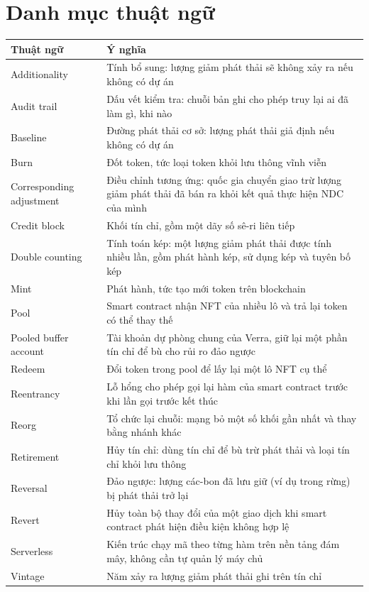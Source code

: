 \documentclass[a4paper,oneside]{report}
\begin{document}
\chapter*{Danh mục thuật ngữ}
{}
\begin{longtable}{@{}p{4.2cm}p{9.9cm}@{}}
\toprule
\textbf{Thuật ngữ} & \textbf{Ý nghĩa} \\
\midrule
\endhead
\bottomrule
\endfoot
Additionality   & Tính bổ sung: lượng giảm phát thải sẽ không xảy ra nếu không có dự án \\
Audit trail     & Dấu vết kiểm tra: chuỗi bản ghi cho phép truy lại ai đã làm gì, khi nào \\
Baseline        & Đường phát thải cơ sở: lượng phát thải giả định nếu không có dự án \\
Burn            & Đốt token, tức loại token khỏi lưu thông vĩnh viễn \\
Corresponding adjustment & Điều chỉnh tương ứng: quốc gia chuyển giao trừ lượng giảm phát thải đã bán ra khỏi kết quả thực hiện NDC của mình \\
Credit block    & Khối tín chỉ, gồm một dãy số sê-ri liên tiếp \\
Double counting & Tính toán kép: một lượng giảm phát thải được tính nhiều lần, gồm phát hành kép, sử dụng kép và tuyên bố kép \\
Mint            & Phát hành, tức tạo mới token trên blockchain \\
Pool            & Smart contract nhận NFT của nhiều lô và trả lại token có thể thay thế \\
Pooled buffer account & Tài khoản dự phòng chung của Verra, giữ lại một phần tín chỉ để bù cho rủi ro đảo ngược \\
Redeem          & Đổi token trong pool để lấy lại một lô NFT cụ thể \\
Reentrancy      & Lỗ hổng cho phép gọi lại hàm của smart contract trước khi lần gọi trước kết thúc \\
Reorg           & Tổ chức lại chuỗi: mạng bỏ một số khối gần nhất và thay bằng nhánh khác \\
Retirement      & Hủy tín chỉ: dùng tín chỉ để bù trừ phát thải và loại tín chỉ khỏi lưu thông \\
Reversal        & Đảo ngược: lượng các-bon đã lưu giữ (ví dụ trong rừng) bị phát thải trở lại \\
Revert          & Hủy toàn bộ thay đổi của một giao dịch khi smart contract phát hiện điều kiện không hợp lệ \\
Serverless      & Kiến trúc chạy mã theo từng hàm trên nền tảng đám mây, không cần tự quản lý máy chủ \\
Vintage         & Năm xảy ra lượng giảm phát thải ghi trên tín chỉ \\
\end{longtable}
\end{document}
